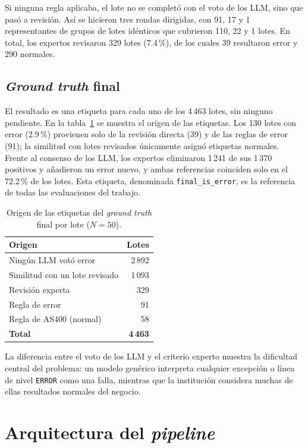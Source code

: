 Si ninguna regla aplicaba, el lote no se completó con el voto de los LLM, sino que pasó a revisión. Así se hicieron tres rondas dirigidas, con 91, 17 y 1 representantes de grupos de lotes idénticos que cubrieron 110, 22 y 1 lotes. En total, los expertos revisaron 329 lotes (7.4\,\%), de los cuales 39 resultaron error y 290 normales.

\subsection{\textit{Ground truth} final}

El resultado es una etiqueta para cada uno de los 4\,463 lotes, sin ninguno pendiente. En la tabla~\ref{tab:met_origen} se muestra el origen de las etiquetas. Los 130 lotes con error (2.9\,\%) provienen solo de la revisión directa (39) y de las reglas de error (91); la similitud con lotes revisados únicamente asignó etiquetas normales. Frente al consenso de los LLM, los expertos eliminaron 1\,241 de sus 1\,370 positivos y añadieron un error nuevo, y ambas referencias coinciden solo en el 72.2\,\% de los lotes. Esta etiqueta, denominada \texttt{final\_is\_error}, es la referencia de todas las evaluaciones del trabajo.

\begin{table}[H]
\centering
\caption{Origen de las etiquetas del \textit{ground truth} final por lote ($N=50$).}
\label{tab:met_origen}
\small
\begin{tabular}{@{}lr@{}}
\toprule
\textbf{Origen} & \textbf{Lotes} \\
\midrule
Ningún LLM votó error & 2\,892 \\
Similitud con un lote revisado & 1\,093 \\
Revisión experta & 329 \\
Regla de error & 91 \\
Regla de AS400 (normal) & 58 \\
\midrule
\textbf{Total} & \textbf{4\,463} \\
\bottomrule
\end{tabular}
\normalsize
\end{table}

La diferencia entre el voto de los LLM y el criterio experto muestra la dificultad central del problema: un modelo genérico interpreta cualquier excepción o línea de nivel \texttt{ERROR} como una falla, mientras que la institución considera muchas de ellas resultados normales del negocio.

\section{Arquitectura del \textit{pipeline}}\label{sec:met_arquitectura}

